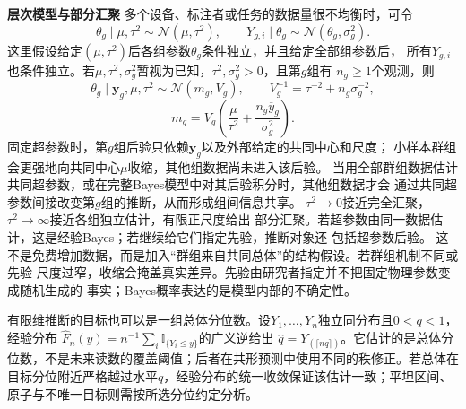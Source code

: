\par\medskip\noindent\textbf{层次模型与部分汇聚}\quad
多个设备、标注者或任务的数据量很不均衡时，可令
\[
  \theta_g\mid\mu,\tau^2\sim\mathcal N(\mu,\tau^2),\qquad
  Y_{g,i}\mid\theta_g\sim\mathcal N(\theta_g,\sigma_g^2).
\]
这里假设给定\((\mu,\tau^2)\)后各组参数\(\theta_g\)条件独立，并且给定全部组参数后，
所有\(Y_{g,i}\)也条件独立。若\(\mu,\tau^2,\sigma_g^2\)暂视为已知，\(\tau^2,\sigma_g^2>0\)，且第\(g\)组有
\(n_g\geq1\)个观测，则
\[
  \theta_g\mid\bm y_g,\mu,\tau^2
  \sim\mathcal N(m_g,V_g),\qquad
  V_g^{-1}=\tau^{-2}+n_g\sigma_g^{-2},
\]
\[
  m_g
  =V_g\left(\frac{\mu}{\tau^2}
    +\frac{n_g\overline y_g}{\sigma_g^2}\right).
\]
固定超参数时，第\(g\)组后验只依赖\(\bm y_g\)以及外部给定的共同中心和尺度；
小样本群组会更强地向共同中心\(\mu\)收缩，其他组数据尚未进入该后验。
当用全部群组数据估计共同超参数，或在完整Bayes模型中对其后验积分时，其他组数据才会
通过共同超参数间接改变第\(g\)组的推断，从而形成组间信息共享。
\(\tau^2\to0\)接近完全汇聚，\(\tau^2\to\infty\)接近各组独立估计，有限正尺度给出
部分汇聚。若超参数由同一数据估计，这是经验Bayes；若继续给它们指定先验，推断对象还
包括超参数后验。
这不是免费增加数据，而是加入“群组来自共同总体”的结构假设。若群组机制不同或先验
尺度过窄，收缩会掩盖真实差异。先验由研究者指定并不把固定物理参数变成随机生成的
事实；Bayes概率表达的是模型内部的不确定性。

有限维推断的目标也可以是一组总体分位数。设\(Y_1,\ldots,Y_n\)独立同分布且\(0<q<1\)，经验分布
\(\widehat F_n(y)=n^{-1}\sum_i\mathbb I_{\{Y_i\leq y\}}\)的广义逆给出
\(\widehat q=Y_{(\lceil nq\rceil)}\)。它估计的是总体分位数，不是未来读数的覆盖阈值；后者在共形预测中使用不同的秩修正。若总体在目标分位附近严格越过水平\(q\)，经验分布的统一收敛保证该估计一致；平坦区间、原子与不唯一目标则需按所选分位约定分析。

